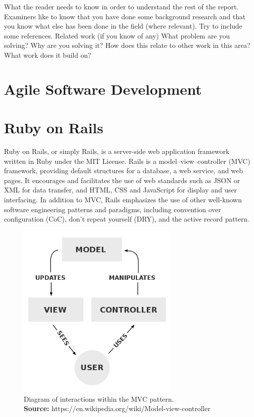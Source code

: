 
What the reader needs to know in order to understand the rest of the report. Examiners like to know that you have done some background research and that you know what else has been done in the field (where relevant). Try to include some references.
    Related work (if you know of any)
    What problem are you solving?
    Why are you solving it?
    How does this relate to other work in this area?
    What work does it build on?
    
\section{Agile Software Development}

\section{Ruby on Rails} 
Ruby on Rails, or simply Rails, is a server-side web application framework written in Ruby under the MIT License. Rails is a model–view–controller (MVC) framework, providing default structures for a database, a web service, and web pages. It encourages and facilitates the use of web standards such as JSON or XML for data transfer, and HTML, CSS and JavaScript for display and user interfacing. In addition to MVC, Rails emphasizes the use of other well-known software engineering patterns and paradigms, including convention over configuration (CoC), don't repeat yourself (DRY), and the active record pattern. \cite{wiki:RoR}
\begin{figure}[H]
	\centering
    \includegraphics[trim={0 0 0 0},clip,width=0.7\textwidth]{Files/MVC.png}
    \caption{Diagram of interactions within the MVC pattern.\\ \textbf{Source:} https://en.wikipedia.org/wiki/Model-view-controller}
    \label{fig: MVC}
\end{figure}


